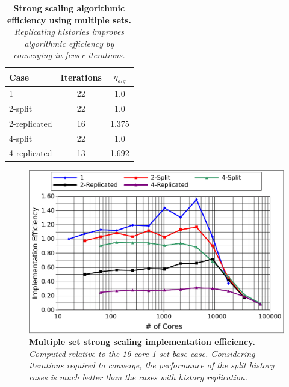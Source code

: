 \begin{table}[h!]
  \begin{center}
    \begin{tabular}{lcc}\hline\hline
      \multicolumn{1}{l}{Case}& 
      \multicolumn{1}{c}{Iterations}&
      \multicolumn{1}{c}{$\eta_{alg}$} \\\hline
      1 & 22 & 1.0 \\
      2-split & 22 & 1.0 \\
      2-replicated & 16 & 1.375 \\
      4-split & 22 & 1.0 \\
      4-replicated & 13 & 1.692 \\
      \hline\hline
    \end{tabular}
  \end{center}
  \caption{\textbf{Strong scaling algorithmic efficiency using
      multiple sets.} \textit{Replicating histories improves
      algorithmic efficiency by converging in fewer iterations.}}
  \label{tab:ms_strong_alg_eff}
\end{table}

\clearpage

\begin{figure}[t!]
  \begin{center}
    \includegraphics[width=6in]{chapters/parallel_mc/titan_strong_ms_impeff.pdf}
  \end{center}
  \caption{\textbf{Multiple set strong scaling implementation
      efficiency.} \textit{Computed relative to the 16-core 1-set base
      case. Considering iterations required to converge, the
      performance of the split history cases is much better than the
      cases with history replication.}}
  \label{fig:titan_strong_ms_impeff}
\end{figure}


